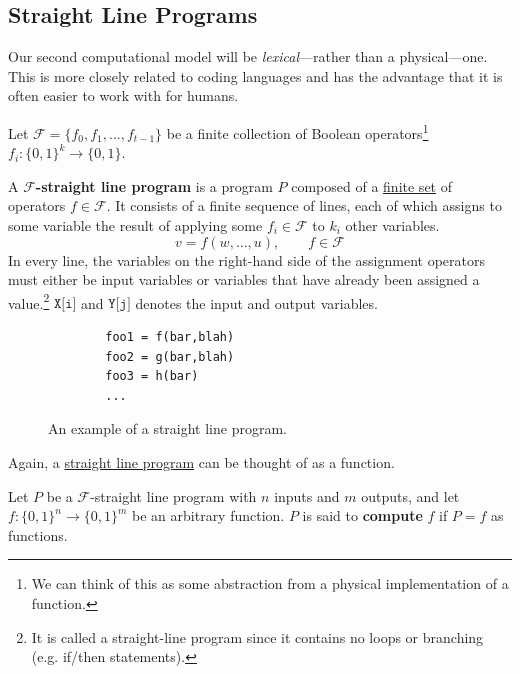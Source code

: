 \subsection{Straight Line Programs}

  Our second computational model will be \textit{lexical}---rather than a physical---one. This is more closely related to coding languages and has the advantage that it is often easier to work with for humans. 

  \begin{definition}
    \label{def:straight-line-program}
    Let $\mathcal{F} = \{f_0, f_1, ..., f_{t-1}\}$ be a finite collection of Boolean operators\footnote{We can think of this as some abstraction from a physical implementation of a function.} $f_i: \{0,1\}^k \to \{0,1\}$. 

    A \textbf{$\mathcal{F}$-straight line program} is a program $P$ composed of a \hyperref[st-def:finite-set]{finite set} of operators $f \in \mathcal{F}$. It consists of a finite sequence of lines, each of which assigns to some variable the result of applying some $f_i \in \mathcal{F}$ to $k_i$ other variables. 
    \begin{equation}
      v = f(w, \ldots, u), \qquad f \in \mathcal{F} 
    \end{equation}
    In every line, the variables on the right-hand side of the assignment operators must either be input variables or variables that have already been assigned a value.\footnote{It is called a straight-line program since it contains no loops or branching (e.g. if/then statements). } 
    $\texttt{X[i]}$ and $\texttt{Y[j]}$ denotes the input and output variables. 

    \begin{figure}[H]
      \centering 
      \begin{lstlisting}
        foo1 = f(bar,blah)
        foo2 = g(bar,blah)
        foo3 = h(bar)
        ...
      \end{lstlisting}
      \caption{An example of a straight line program. } 
      \label{fig:straight-line}
    \end{figure}
  \end{definition}

  Again, a \hyperref[def:straight-line-program]{straight line program} can be thought of as a function. 

  \begin{definition}
    \label{def:computability-of-straight-line-programs}
    Let $P$ be a $\mathcal{F}$-straight line program with $n$ inputs and $m$ outputs, and let $f: \{0, 1\}^n \to \{0, 1\}^m$ be an arbitrary function. $P$ is said to \textbf{compute} $f$ if $P = f$ as functions. 
  \end{definition}

